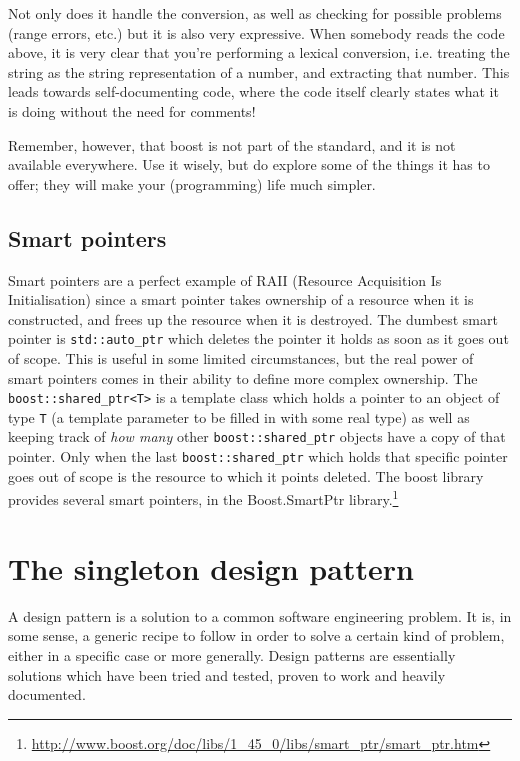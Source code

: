 \documentclass[a4paper]{scrartcl}
\begin{document}
Not only does it handle the conversion, as well as checking for possible problems (range errors, etc.) but it is also very expressive. When somebody reads the code above, it is very clear that you're performing a lexical conversion, i.e. treating the string as the string representation of a number, and extracting that number. This leads towards self-documenting code, where the code itself clearly states what it is doing without the need for comments!

Remember, however, that boost is not part of the standard, and it is not available everywhere. Use it wisely, but do explore some of the things it has to offer; they will make your (programming) life much simpler.

\subsection{Smart pointers}\label{sec:boost_smart_ptr}
Smart pointers are a perfect example of RAII (Resource Acquisition Is Initialisation) since a smart pointer takes ownership of a resource when it is constructed, and frees up the resource when it is destroyed. The dumbest smart pointer is \verb|std::auto_ptr| which deletes the pointer it holds as soon as it goes out of scope. This is useful in some limited circumstances, but the real power of smart pointers comes in their ability to define more complex ownership. The \verb|boost::shared_ptr<T>| is a template class which holds a pointer to an object of type \verb|T| (a template parameter to be filled in with some real type) as well as keeping track of \emph{how many} other \verb|boost::shared_ptr| objects have a copy of that pointer. Only when the last \verb|boost::shared_ptr| which holds that specific pointer goes out of scope is the resource to which it points deleted. The boost library provides several smart pointers, in the Boost.SmartPtr library.\footnote{\url{http://www.boost.org/doc/libs/1_45_0/libs/smart_ptr/smart_ptr.htm}}

\section{The singleton design pattern}\label{sec:singleton}
A design pattern is a solution to a common software engineering problem. It is, in some sense, a generic recipe to follow in order to solve a certain kind of problem, either in a specific case or more generally. Design patterns are essentially solutions which have been tried and tested, proven to work and heavily documented.
\end{document}
